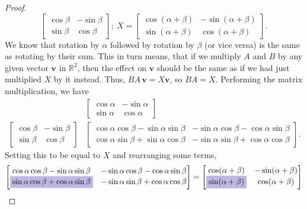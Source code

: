 \documentclass{article}
\begin{document}
\begin{enumerate}
\begin{enumerate}
\begin{proof}
\[\begin{bmatrix}
                    \cos\beta&-\sin\beta \\ \sin\beta&\cos\beta
                \end{bmatrix};~X =  \begin{bmatrix}
                    \cos(\alpha + \beta)&-\sin(\alpha + \beta) \\ \sin(\alpha+\beta)&\cos(\alpha + \beta)
                \end{bmatrix}.
            \] We know that rotation by \(\alpha\) followed by rotation by \(\beta\) (or vice versa) is the same as rotating by their sum. This in turn means, that if we multiply \(A\) and \(B\) by any given vector \(\mathbf{v}\) in \(\mathbb{R}^2\), then the effect on \(\mathbf{v}\)
            should be the same as if we had just multiplied \(X\) by it instead. Thus, \(BA\,\mathbf{v} = X\mathbf{v}\), so \(BA = X\). Performing the matrix multiplication, we have\begin{align*}
                &\begin{bmatrix}
                    \cos\alpha&-\sin\alpha \\ \sin\alpha&\cos\alpha
                \end{bmatrix} \\
                \begin{bmatrix}
                    \cos\beta&-\sin\beta \\ \sin\beta&\cos\beta
                \end{bmatrix} & \begin{bmatrix}
                    \cos\alpha\cos\beta - \sin\alpha\sin\beta&-\sin\alpha\cos\beta-\cos\alpha\sin\beta \\ 
                    \cos\alpha\sin\beta + \sin\alpha\cos\beta& -\sin\alpha\sin\beta + \cos\alpha\cos\beta
                \end{bmatrix}.
            \end{align*} Setting this to be equal to \(X\) and rearranging some terms,\[
                \begin{bmatrix}
                    \cos\alpha\cos\beta - \sin\alpha\sin\beta&-\sin\alpha\cos\beta-\cos\alpha\sin\beta \\ 
                    \colorbox{Periwinkle!42}{\(\sin\alpha\cos\beta + \cos\alpha\sin\beta\)}& -\sin\alpha\sin\beta + \cos\alpha\cos\beta
                \end{bmatrix} = \begin{bmatrix}
                    \cos(\alpha + \beta)&-\sin(\alpha + \beta) \\ \colorbox{Periwinkle!42}{\(\sin(\alpha+\beta)\)}&\cos(\alpha + \beta)

\end{bmatrix}\]
\end{proof}
\end{enumerate}
\end{enumerate}
\end{document}
